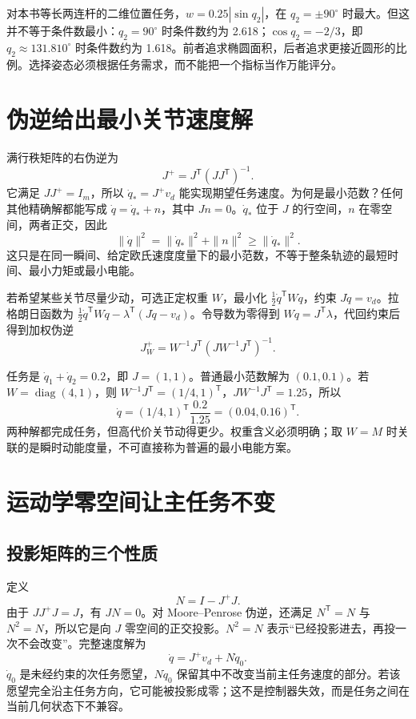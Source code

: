 对本书等长两连杆的二维位置任务，$w=0.25|\sin q_2|$，在 $q_2=\pm90^\circ$ 时最大。但这并不等于条件数最小：$q_2=90^\circ$ 时条件数约为 2.618；$\cos q_2=-2/3$，即 $q_2\approx131.810^\circ$ 时条件数约为 1.618。前者追求椭圆面积，后者追求更接近圆形的比例。选择姿态必须根据任务需求，而不能把一个指标当作万能评分。

\section{伪逆给出最小关节速度解}
满行秩矩阵的右伪逆为
\begin{equation}
 J^+=J^\mathsf T(JJ^\mathsf T)^{-1}.
\end{equation}
它满足 $JJ^+=I_m$，所以 $\dot q_*=J^+v_d$ 能实现期望任务速度。为何是最小范数？任何其他精确解都能写成 $\dot q=\dot q_*+n$，其中 $Jn=0$。$\dot q_*$ 位于 $J$ 的行空间，$n$ 在零空间，两者正交，因此
\begin{equation}
 \|\dot q\|^2=\|\dot q_*\|^2+\|n\|^2\ge\|\dot q_*\|^2.
\end{equation}
这只是在同一瞬间、给定欧氏速度度量下的最小范数，不等于整条轨迹的最短时间、最小力矩或最小电能。

若希望某些关节尽量少动，可选正定权重 $W$，最小化 $\frac12\dot q^\mathsf TW\dot q$，约束 $J\dot q=v_d$。拉格朗日函数为 $\frac12\dot q^\mathsf TW\dot q-\lambda^\mathsf T(J\dot q-v_d)$。令导数为零得到 $W\dot q=J^\mathsf T\lambda$，代回约束后得到加权伪逆
\begin{equation}
 J_W^+=W^{-1}J^\mathsf T(JW^{-1}J^\mathsf T)^{-1}.
\end{equation}
\begin{examplebox}[算例 给第一关节更高代价]
任务是 $\dot q_1+\dot q_2=0.2$，即 $J=(1,1)$。普通最小范数解为 $(0.1,0.1)$。若 $W=\operatorname{diag}(4,1)$，则 $W^{-1}J^\mathsf T=(1/4,1)^\mathsf T$，$JW^{-1}J^\mathsf T=1.25$，所以
\[
 \dot q=(1/4,1)^\mathsf T\frac{0.2}{1.25}=(0.04,0.16)^\mathsf T.
\]
两种解都完成任务，但高代价关节动得更少。权重含义必须明确；取 $W=M$ 时关联的是瞬时动能度量，不可直接称为普遍的最小电能方案。
\end{examplebox}

\section{运动学零空间让主任务不变}
\subsection{投影矩阵的三个性质}
定义
\begin{equation}
 N=I-J^+J.
\end{equation}
由于 $JJ^+J=J$，有 $JN=0$。对 Moore--Penrose 伪逆，还满足 $N^\mathsf T=N$ 与 $N^2=N$，所以它是向 $J$ 零空间的正交投影。$N^2=N$ 表示“已经投影进去，再投一次不会改变”。完整速度解为
\begin{equation}
 \dot q=J^+v_d+N\dot q_0.
\end{equation}
$\dot q_0$ 是未经约束的次任务愿望，$N\dot q_0$ 保留其中不改变当前主任务速度的部分。若该愿望完全沿主任务方向，它可能被投影成零；这不是控制器失效，而是任务之间在当前几何状态下不兼容。


